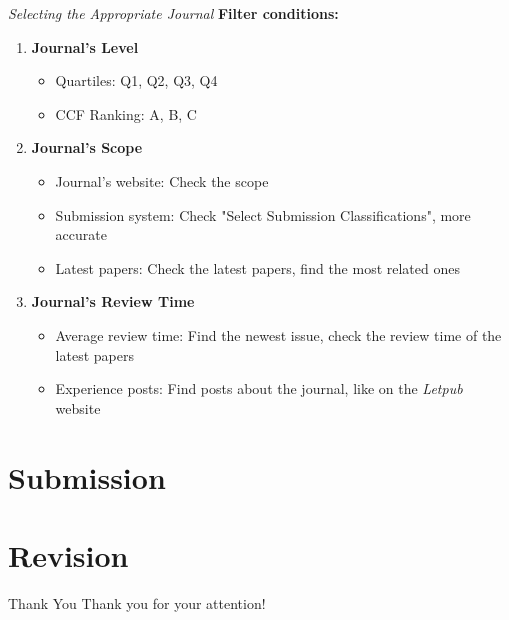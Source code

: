 \documentclass{beamer}
\begin{document}
\begin{frame}{\textit{Selecting the Appropriate Journal}}
    \textbf{Filter conditions:}
    \begin{enumerate}
        \item \textbf{Journal's Level}
              \begin{itemize}
                  \item Quartiles: Q1, Q2, Q3, Q4
                  \item CCF Ranking: A, B, C
              \end{itemize}
        \item \textbf{Journal's Scope}
              \begin{itemize}
                  \item Journal's website: Check the scope
                  \item Submission system: Check "Select Submission Classifications", more accurate
                  \item Latest papers: Check the latest papers, find the most related ones
              \end{itemize}
        \item \textbf{Journal's Review Time}
              \begin{itemize}
                  \item Average review time: Find the newest issue, check the review time of the latest papers
                  \item Experience posts: Find posts about the journal, like on the \textit{Letpub} website
              \end{itemize}

    \end{enumerate}
\end{frame}

\section{Submission}

\section{Revision}


\begin{frame}{Thank You}
    \centering
    \Large
    Thank you for your attention! \\
\end{frame}
\end{document}
